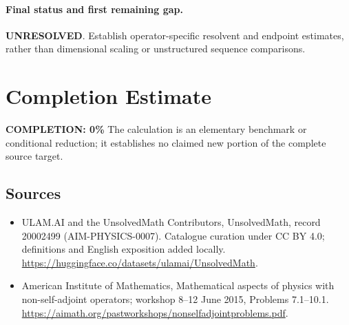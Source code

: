 \documentclass[11pt]{article}
\begin{document}
\paragraph{Final status and first remaining gap.}
\textbf{UNRESOLVED}. Establish operator-specific resolvent and endpoint estimates, rather than dimensional scaling or unstructured sequence comparisons.

\section{Completion Estimate}
\noindent\textbf{COMPLETION: 0\%}
The calculation is an elementary benchmark or conditional reduction; it establishes no claimed new portion of the complete source target.

\subsection{Sources}
\begin{itemize}
\item[\hypertarget{source:20002499:1}{S1}] ULAM.AI and the UnsolvedMath Contributors, UnsolvedMath, record 20002499 (AIM-PHYSICS-0007). Catalogue curation under CC BY 4.0; definitions and English exposition added locally.
\url{https://huggingface.co/datasets/ulamai/UnsolvedMath}.
\item[\hypertarget{source:20002499:2}{S2}] American Institute of Mathematics, Mathematical aspects of physics with non-self-adjoint operators; workshop 8–12 June 2015, Problems 7.1–10.1.
\url{https://aimath.org/pastworkshops/nonselfadjointproblems.pdf}.
\end{itemize}
\label{end:20002499}
\end{document}
